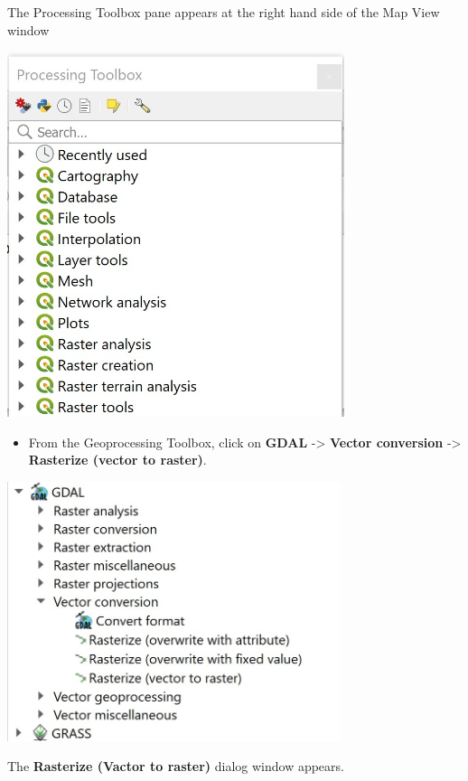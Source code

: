 \documentclass[
  letterpaper,
  DIV=11,
  numbers=noendperiod]{scrreprt}
\providecommand{\tightlist}{%
  \setlength{\itemsep}{0pt}\setlength{\parskip}{0pt}}\usepackage{longtable,booktabs,array}
\begin{document}
The Processing Toolbox pane appears at the right hand side of the Map
View window

\includegraphics[width=3.88542in,height=\textheight]{./img06/image7.jpg}

\begin{itemize}
\tightlist
\item
  From the Geoprocessing Toolbox, click on \textbf{GDAL} -\textgreater{}
  \textbf{Vector conversion} -\textgreater{} \textbf{Rasterize (vector
  to raster)}.
\end{itemize}

\includegraphics[width=3.84375in,height=\textheight]{./img06/image8.jpg}

The \textbf{Rasterize (Vactor to raster)} dialog window appears.
\end{document}
